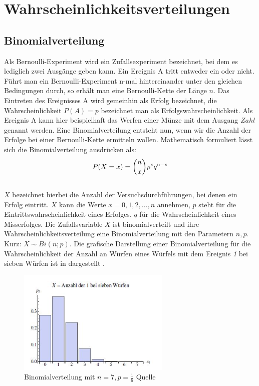 \section{Wahrscheinlichkeitsverteilungen}
\label{sec.Wahrscheinlichkeitsverteilungen}
\subsection{Binomialverteilung}
\label{sec.Binomialverteilung}
Als Bernoulli-Experiment wird ein Zufallsexperiment bezeichnet, bei dem es lediglich zwei Ausgänge geben kann. Ein Ereignis A tritt entweder ein oder nicht. Führt man ein Bernoulli-Experiment n-mal hintereinander unter den gleichen Bedingungen durch, so erhält man eine Bernoulli-Kette der Länge $n$. Das Eintreten des Ereignisses A wird gemeinhin als Erfolg bezeichnet, die Wahrscheinlichkeit $P(A)=p$ bezeichnet man als Erfolgswahrscheinlichkeit. Als Ereignis A kann hier beispielhaft das Werfen einer Münze mit dem Ausgang $Zahl$ genannt werden. Eine Binomialverteilung entsteht nun, wenn wir die Anzahl der Erfolge bei einer Bernoulli-Kette ermitteln wollen. Mathematisch formuliert lässt sich die Binomialverteilung ausdrücken als:
\begin{equation}
	\label{eq:Binomialverteilung}
	P(X=x) = \binom{n}{x}p^{\mathrm{x}} q^{\mathrm{n-x}}
\end{equation}\\
$X$ bezeichnet hierbei die Anzahl der Versuchsdurchführungen, bei denen ein Erfolg eintritt. $X$ kann die Werte $x = 0,1,2,\dots,n$ annehmen, $p$ steht für die Eintrittswahrscheinlichkeit eines Erfolges, $q$ für die Wahrscheinlichkeit eines Misserfolges. Die Zufallsvariable $X$ ist binomialverteilt und ihre Wahrscheinlichkeitsverteilung eine Binomialverteilung mit den Parametern $n,p$. Kurz: $X \sim Bi(n;p)$. Die grafische Darstellung einer Binomialverteilung für die Wahrscheinlichkeit der Anzahl an Würfen eines Würfels mit dem Ereignis \textit{1} bei sieben Würfen ist in  dargestellt \cite{Teschl.2014}.

\begin{figure}[!ht]
	\begin{center}
		\includegraphics[height=50mm]{Abbildungen/grundlagen/Binomialverteilung}
		\caption{Binomialverteilung mit $n = 7, p = \frac{1}{6}$ Quelle \cite{Teschl.2014}}
		\label{fig.Poisson_Verteilung}
	\end{center}
\end{figure}
